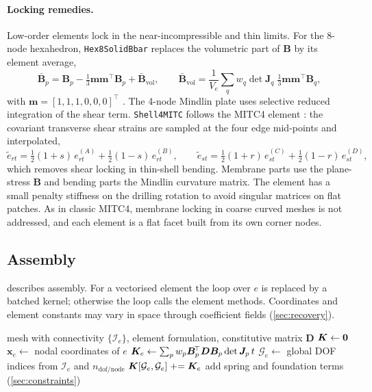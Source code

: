 \paragraph{Locking remedies.}
Low-order elements lock in the near-incompressible and thin limits. For the 8-node hexahedron, \texttt{Hex8SolidBbar} replaces the volumetric part of $\bm B$ by its element average,
\begin{equation}
  \bar{\bm B}_p=\bm B_p-\tfrac13\bm m\bm m^{\!\top}\bm B_p+\bar{\bm B}_{\mathrm{vol}},\qquad
  \bar{\bm B}_{\mathrm{vol}}=\frac{1}{V_e}\sum_q w_q\det\bm J_q\;\tfrac13\bm m\bm m^{\!\top}\bm B_q,
  \label{eq:bbar}
\end{equation}
with $\bm m=[1,1,1,0,0,0]^{\!\top}$ \cite{hughes1980bbar}. The 4-node Mindlin plate uses selective reduced integration of the shear term.
\texttt{Shell4MITC} follows the MITC4 element \cite{dvorkin1984}: the covariant transverse shear strains are sampled at the four edge mid-points and interpolated,
\begin{equation}
  \tilde e_{rt}=\tfrac12(1+s)\,e_{rt}^{(A)}+\tfrac12(1-s)\,e_{rt}^{(B)},\qquad
  \tilde e_{st}=\tfrac12(1+r)\,e_{st}^{(C)}+\tfrac12(1-r)\,e_{st}^{(D)},
  \label{eq:mitc}
\end{equation}
which removes shear locking in thin-shell bending. Membrane parts use the plane-stress $\bm B$ and bending parts the Mindlin curvature matrix. The element has a small penalty stiffness on the drilling rotation to
avoid singular matrices on flat patches. As in classic MITC4, membrane locking in coarse curved meshes is not addressed, and each element is a flat facet built from its own corner nodes.

\subsection{Assembly}
 describes assembly. For a vectorised element the loop over $e$ is replaced by a batched kernel; otherwise the loop calls the element methods. Coordinates and
element constants may vary in space through coefficient fields (\cref{sec:recovery}).

\begin{algorithm}[t]
\caption{Global assembly of $\K$ (and, identically, $\M$)}\label{alg:assembly}
\begin{algorithmic}[1]
\Require mesh with connectivity $\{\mathcal I_e\}$, element formulation, constitutive matrix $\bm D$
\State $\bm{K}\gets\bm 0$ 
  \State $\bm x_e\gets$ nodal coordinates of $e$
  \State $\bm{K}_e\gets\sum_p w_p\bm B_p^{\!\top}\bm D\bm B_p\det\bm J_p\,t$ 
  \State $\mathcal G_e\gets$ global DOF indices from $\mathcal I_e$ and $n_{\mathrm{dof/node}}$
  \State $\bm{K}[\mathcal G_e,\mathcal G_e]\mathrel{+}=\bm{K}_e$
\EndFor
\State add spring and foundation terms (\cref{sec:constraints})
\end{algorithmic}
\end{algorithm}
